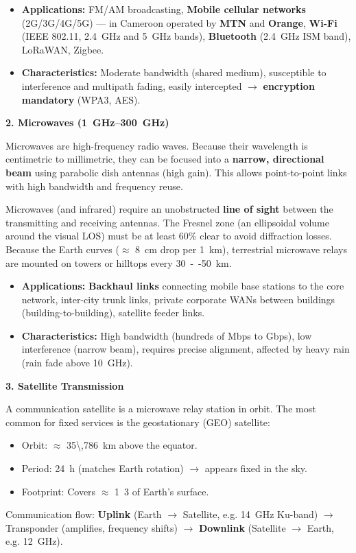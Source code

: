 \documentclass[11pt]{article}
\newcommand{\cle}[1]{{\popxbold\color{popdark}#1}}
\begin{document}
\begin{itemize}
\item \textbf{Applications:} FM/AM broadcasting, \textbf{Mobile cellular networks} (2G/3G/4G/5G) --- in Cameroon operated by \textbf{MTN} and \textbf{Orange}, \textbf{Wi-Fi} (IEEE 802.11, \SI{2.4}{GHz} and \SI{5}{GHz} bands), \textbf{Bluetooth} (\SI{2.4}{GHz} ISM band), LoRaWAN, Zigbee.
\item \textbf{Characteristics:} Moderate bandwidth (shared medium), susceptible to interference and multipath fading, easily intercepted $\rightarrow$ \textbf{encryption mandatory} (WPA3, AES).
\end{itemize}

\textbf{2. Microwaves (\SIrange{1}{300}{GHz})}\par
Microwaves are high-frequency radio waves. Because their wavelength is centimetric to millimetric, they can be focused into a \textbf{narrow, directional beam} using parabolic dish antennas (high gain). This allows point-to-point links with high bandwidth and frequency reuse.

\begin{propriete}
\cle{Microwaves} (and infrared) require an unobstructed \textbf{line of sight} between the transmitting and receiving antennas. The Fresnel zone (an ellipsoidal volume around the visual LOS) must be at least 60\% clear to avoid diffraction losses. Because the Earth curves ($\approx$ \SI{8}{cm} drop per \SI{1}{km}), terrestrial microwave relays are mounted on towers or hilltops every \SI{30}{--}\SI{50}{km}.
\end{propriete}

\begin{itemize}
\item \textbf{Applications:} \textbf{Backhaul links} connecting mobile base stations to the core network, inter-city trunk links, private corporate WANs between buildings (building-to-building), satellite feeder links.
\item \textbf{Characteristics:} High bandwidth (hundreds of Mbps to Gbps), low interference (narrow beam), requires precise alignment, affected by heavy rain (rain fade above \SI{10}{GHz}).
\end{itemize}

\textbf{3. Satellite Transmission}\par
A communication satellite is a microwave relay station in orbit. The most common for fixed services is the \cle{geostationary (GEO) satellite}:
\begin{itemize}
\item Orbit: $\approx$ \SI{35\,786}{km} above the equator.
\item Period: \SI{24}{h} (matches Earth rotation) $\rightarrow$ appears fixed in the sky.
\item Footprint: Covers $\approx$ \SI{1}{3} of Earth's surface.
\end{itemize}
Communication flow: \textbf{Uplink} (Earth $\rightarrow$ Satellite, e.g. \SI{14}{GHz} Ku-band) $\rightarrow$ Transponder (amplifies, frequency shifts) $\rightarrow$ \textbf{Downlink} (Satellite $\rightarrow$ Earth, e.g. \SI{12}{GHz}).
\end{document}
